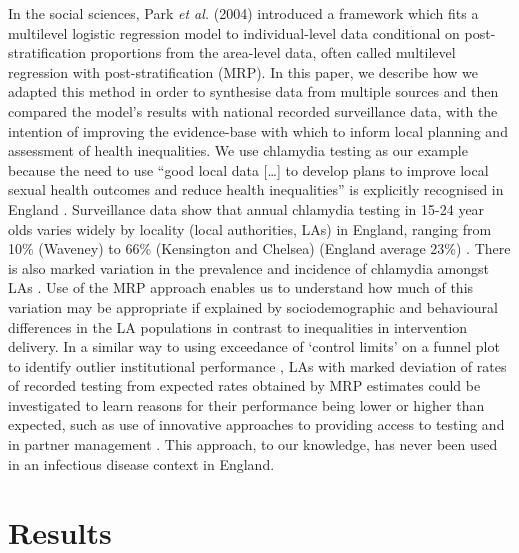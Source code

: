 \documentclass[12pt]{article}
\begin{document}
In the social sciences, Park {\it et al.} (2004) \cite{Park2004} introduced a framework which fits a multilevel logistic regression model to individual-level data conditional on post-stratification proportions from the area-level data, often called multilevel regression with post-stratification (MRP). In this paper, we describe how we adapted this method \cite{Park2004} in order to synthesise data from multiple sources and then compared the model’s results with national recorded surveillance data, with the intention of improving the evidence-base with which to inform local planning and assessment of health inequalities. We use chlamydia testing as our example because the need to use “good local data […] to develop plans to improve local sexual health outcomes and reduce health inequalities” is explicitly recognised in England \cite{DepartmentofHealth2013}. Surveillance data show that annual chlamydia testing in 15-24 year olds varies widely by locality (local authorities, LAs) in England, ranging from 10\% (Waveney) to 66\% (Kensington and Chelsea) (England average 23\%) \cite{PublicHealthEngland2016}. There is also marked variation in the prevalence and incidence of chlamydia amongst LAs \cite{Lewis2017}. Use of the MRP approach enables us to understand how much of this variation may be appropriate if explained by sociodemographic and behavioural differences in the LA populations in contrast to inequalities in intervention delivery. In a similar way to using exceedance of ‘control limits’ on a funnel plot to identify outlier institutional performance \cite{Spiegelhalter2005}, LAs with marked deviation of rates of recorded testing from expected rates obtained by MRP estimates could be investigated to learn reasons for their performance being lower or higher than expected, such as use of innovative approaches to providing access to testing \cite{Estcourt2016} and in partner management \cite{Althaus2014}. This approach, to our knowledge, has never been used in an infectious disease context in England.


\section*{Results}
\end{document}
